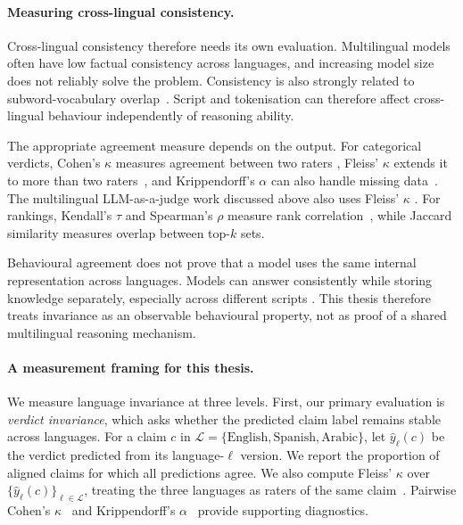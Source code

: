 \paragraph{Measuring cross-lingual consistency.}
Cross-lingual consistency therefore needs its own evaluation. Multilingual models
often have low factual consistency across languages, and increasing model size
does not reliably solve the problem. Consistency is also strongly related to
subword-vocabulary overlap~\cite{Qi_2023}. Script and tokenisation can therefore
affect cross-lingual behaviour independently of reasoning ability.

The appropriate agreement measure depends on the output. For categorical verdicts,
Cohen's $\kappa$ measures agreement between two raters
\cite{cohen1960coefficient}, Fleiss' $\kappa$ extends it to more than two
raters~\cite{fleiss1971measuring}, and Krippendorff's $\alpha$ can also handle
missing data~\cite{krippendorff2004content}. The multilingual LLM-as-a-judge work
discussed above also uses Fleiss' $\kappa$
\cite{fu2025reliablemultilingualllmasajudge}. For rankings, Kendall's $\tau$ and
Spearman's $\rho$ measure rank correlation~\cite{kendall1938new,spearman1904proof},
while Jaccard similarity measures overlap between top-$k$ sets.

Behavioural agreement does not prove that a model uses the same internal
representation across languages. Models can answer consistently while storing
knowledge separately, especially across different scripts
\cite{ifergan2024beneathsurfaceconsistencyexploring}. This thesis therefore treats
invariance as an observable behavioural property, not as proof of a shared
multilingual reasoning mechanism.

\paragraph{A measurement framing for this thesis.}
We measure language invariance at three levels. First, our primary evaluation is
\emph{verdict invariance}, which asks whether the predicted claim label remains stable across languages. For a
claim $c$ in
$\mathcal{L} = \{\text{English}, \text{Spanish}, \text{Arabic}\}$, let
$\hat{y}_\ell(c)$ be the verdict predicted from its language-$\ell$ version. We
report the proportion of aligned claims for which all predictions agree. We also
compute Fleiss' $\kappa$ over
$\{\hat{y}_\ell(c)\}_{\ell \in \mathcal{L}}$, treating the three languages as
raters of the same claim~\cite{fleiss1971measuring}. Pairwise Cohen's
$\kappa$~\cite{cohen1960coefficient} and Krippendorff's
$\alpha$~\cite{krippendorff2004content} provide supporting diagnostics.

